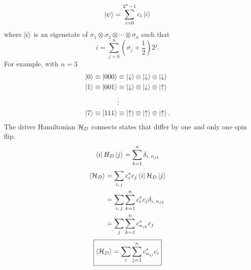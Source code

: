 \begin{equation}
  \left| \psi \right> = \sum_{i=0}^{2^n-1} c_i \left| i \right>
  \label{}
\end{equation}
where $\left| i \right>$ is an eigenstate of
$\sigma_1 \otimes \sigma_2 \otimes \cdots \otimes \sigma_n$
such that
\begin{equation}
  i = \sum_{j=0}^n \left( \sigma_j + \frac{1}{2} \right) 2^j.
  \label{}
\end{equation}
For example, with $n=3$
\begin{align*}
  \left| 0 \right> \equiv \left| 000 \right>
  &\equiv
  \left| \downarrow \right> \otimes
  \left| \downarrow \right> \otimes
  \left| \downarrow \right> \\
  \left| 1 \right> \equiv \left| 001 \right>
  &\equiv
  \left| \downarrow \right> \otimes
  \left| \downarrow \right> \otimes
  \left| \uparrow \right> \\
  &\vdots \\
  \left| 7 \right> \equiv \left| 111 \right>
  &\equiv
  \left| \uparrow \right> \otimes
  \left| \uparrow \right> \otimes
  \left| \uparrow \right>.
  \label{}
\end{align*}
The driver Hamiltonian $\mathcal{H}_D$ connects states that differ by one and only one
spin flip.
\begin{equation}
  \matrixel{i}{H_D}{j} = \sum_{k=1}^n \delta_{i,\, n_{jk}}
  \label{}
\end{equation}
\begin{align}
  \avg{\ham_D}
  &= \sum_{i,\,j} c_i^* c_j \matrixel{i}{\ham_D}{j} \\
  &= \sum_{i,\,j} \sum_{k=1}^n c_i^* c_j \delta_{i,\, n_{jk}} \\
  &= \sum_j \sum_{k=1}^n c_{n_{jk}}^* c_j
  \label{}
\end{align}
\begin{equation}
  \boxed{
  \left< \mathcal{H}_D \right> = \sum_i \sum_{j=1}^n c_{n_{ij}}^* c_i
  }
  \label{}
\end{equation}


